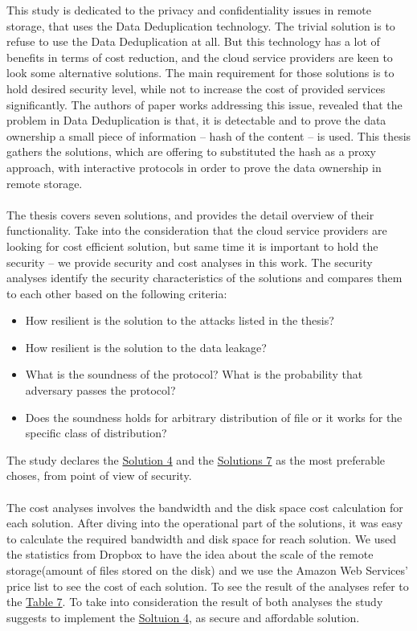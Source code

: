 \documentclass[12pt]{article}
\begin{document}
This study is dedicated to the privacy and confidentiality issues in remote storage, that uses the Data Deduplication technology. The trivial solution is to refuse to use the Data Deduplication at all. But this technology has a lot of benefits in terms of cost reduction, and the cloud service providers are keen to look some alternative solutions. The main requirement for those solutions is to hold desired security level, while not to increase the cost of provided services significantly. The authors of paper works addressing this issue, revealed that the problem in Data Deduplication is that, it is detectable and to prove the data ownership a small piece of information -- hash of the content -- is used. This thesis gathers the solutions, which are offering to substituted the hash as a proxy approach, with interactive protocols in order to prove the data ownership in remote storage. \\\\
The thesis covers seven solutions, and provides the detail overview of their functionality. Take into the consideration that the cloud service providers are looking for cost efficient solution, but same time it is important to hold the security -- we provide security and cost analyses in this work.  The security analyses identify the  security characteristics of the solutions and compares them to each other based on the following criteria: 
\begin{itemize}
 \item How resilient is the solution to the attacks listed in the thesis? 
 \item How resilient is the solution to the data leakage?
 \item What is the soundness of the protocol? What is the probability that adversary passes the protocol?
 \item Does the soundness holds for arbitrary distribution of file or it works for the specific class of distribution?
\end{itemize}
The study declares the \hyperref[sub:Soltuion4]{Solution 4} and the \hyperref[sub:Soltuion7]{Solutions 7} as the most preferable choses, from point of view of security.\\\\
The cost analyses involves  the bandwidth and the disk space cost calculation for each solution. After diving into the operational part of the solutions, it was easy to calculate the required bandwidth and disk space for reach solution. We used the statistics from Dropbox to have the idea about the scale of the remote storage(amount of files stored on the disk) and we use the Amazon Web Services' price list to see the cost of each solution. To see the result of the analyses refer to the \hyperref[table:AWS-S3]{Table 7}. To take into consideration the result of both analyses the study suggests to implement the \hyperref[sub:Soltuion4]{Soltuion 4}, as secure and affordable solution.\\\\
\end{document}

